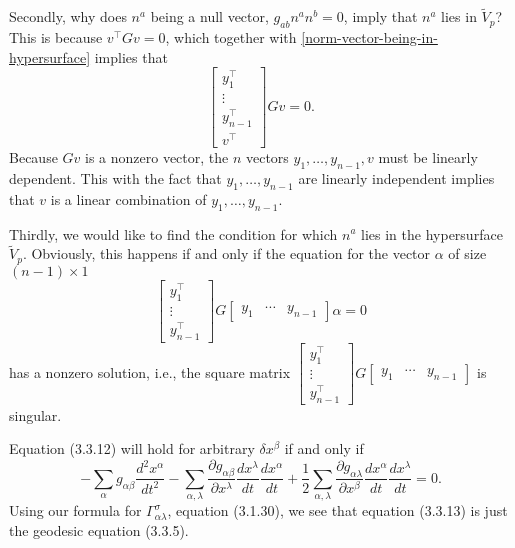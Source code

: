 \documentclass{note}
\numberwithin{equation}{chapter}
\begin{document}
Secondly, why does $n^a$ being a null vector, $g_{ab}n^a n^b = 0$, imply that
$n^a$ lies in $\tilde{V}_p$? This is because $v^\top Gv = 0$, which together
with \eqref{norm-vector-being-in-hypersurface} implies that
\begin{equation*}
    \begin{bmatrix}
        y_1^\top     \\
        \vdots       \\
        y_{n-1}^\top \\
        v^\top
    \end{bmatrix}
    Gv = 0.
\end{equation*}
Because $Gv$ is a nonzero vector, the $n$ vectors $y_1, \dots, y_{n-1}, v$ must
be linearly dependent. This with the fact that $y_1, \dots, y_{n-1}$ are
linearly independent implies that $v$ is a linear combination of $y_1, \dots,
    y_{n-1}$.

Thirdly, we would like to find the condition for which $n^a$ lies in the
hypersurface $\tilde{V}_p$. Obviously, this happens if and only if the equation
for the vector $\alpha$ of size $(n-1)\times1$
\begin{equation*}
    \begin{bmatrix}
        y_1^\top \\
        \vdots   \\
        y_{n-1}^\top
    \end{bmatrix}
    G
    \begin{bmatrix}
        y_1 & \cdots & y_{n-1}
    \end{bmatrix}\alpha = 0
\end{equation*}
has a nonzero solution, i.e., the square matrix $\begin{bmatrix}
        y_1^\top \\
        \vdots   \\
        y_{n-1}^\top
    \end{bmatrix}
    G
    \begin{bmatrix}
        y_1 & \cdots & y_{n-1}
    \end{bmatrix}$ is singular.


\begin{quotebar}
    Equation (3.3.12) will hold for arbitrary $ \delta x^\beta$ if and only if
    \begin{equation*}
        - \sum_{\alpha} g_{\alpha\beta} \frac{d^2 x^\alpha}{dt^2}
        - \sum_{\alpha, \lambda} \frac{\partial g_{\alpha\beta}}{\partial x^\lambda} \frac{dx^\lambda}{dt} \frac{dx^\alpha}{dt}
        + \frac{1}{2} \sum_{\alpha, \lambda} \frac{\partial g_{\alpha\lambda}}{\partial x^\beta} \frac{dx^\alpha}{dt} \frac{dx^\lambda}{dt} = 0.
    \end{equation*}
    Using our formula for $\Gamma^\sigma_{\alpha\lambda}$, equation (3.1.30), we
    see that equation (3.3.13) is just the geodesic equation (3.3.5).
\end{quotebar}
\end{document}
